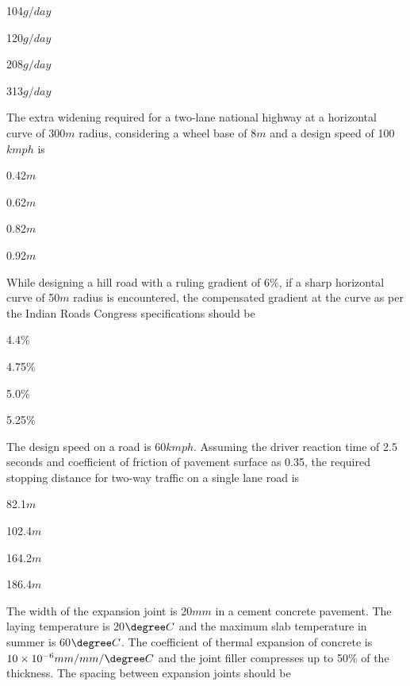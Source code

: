 \begin{enumerate}
\begin{multicols}{4}
\item 104$g/day$
\item 120$g/day$
\item 208$g/day$
\item 313$g/day$
\end{multicols}
\end{enumerate}
\item The extra widening required for a two-lane national highway at a horizontal curve of 300$m$ radius, considering a wheel base of 8$m$ and a design speed of 100$kmph$ is
\begin{enumerate}
\begin{multicols}{4}
\item 0.42$m$
\item 0.62$m$
\item  0.82$m$
\item 0.92$m$
\end{multicols}
\end{enumerate}
\item While designing a hill road with a ruling gradient of 6\%, if a sharp horizontal curve of 50$m$ radius is encountered, the compensated gradient at the curve as per the Indian Roads Congress specifications should be
\begin{enumerate}
\begin{multicols}{4}
\item 4.4\%
\item 4.75\%
\item 5.0\%
\item 5.25\%
\end{multicols}
\end{enumerate}
\item The design speed on a road is 60$kmph$. Assuming the driver reaction time of 2.5 seconds and coefficient of friction of pavement surface as 0.35, the required stopping distance for two-way traffic on a single lane road is
\begin{enumerate}
\begin{multicols}{4}
\item 82.1$m$
\item 102.4$m$
\item 164.2$m$
\item 186.4$m$
\end{multicols}
\end{enumerate}
\item The width of the expansion joint is 20$mm$ in a cement concrete pavement. The laying temperature is 20$\degree C$ and the maximum slab temperature in summer is 60$\degree C$. The coefficient of thermal expansion of concrete is $10\times10^{-6} mm/mm/\degree C$ and the joint filler compresses up to 50\% of the thickness. The spacing between expansion joints should be 
